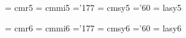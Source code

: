  \font\fivrm  = cmr5               %
 \font\fivmi  = cmmi5              %
    \skewchar\fivmi ='177          %
 \font\fivsy  = cmsy5              %
    \skewchar\fivsy ='60           %
 \font\fivly  = lasy5             %
 
 \font\sixrm  = cmr6               %
 \font\sixmi  = cmmi6              %
    \skewchar\sixmi ='177          %
 \font\sixsy  = cmsy6              %
    \skewchar\sixsy ='60           %
 \font\sixly  = lasy6             %
 
